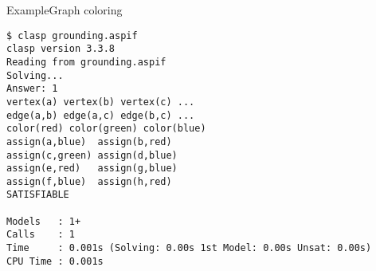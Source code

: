 \begin{frame}[fragile]{Example}{Graph coloring}
\begin{adjustbox}{max totalsize={\textwidth}{.83\textheight},keepaspectratio}
\begin{lstlisting}
$ clasp grounding.aspif
clasp version 3.3.8
Reading from grounding.aspif
Solving...
Answer: 1
vertex(a) vertex(b) vertex(c) ...
edge(a,b) edge(a,c) edge(b,c) ...
color(red) color(green) color(blue)
assign(a,blue)  assign(b,red)
assign(c,green) assign(d,blue)
assign(e,red)   assign(g,blue)
assign(f,blue)  assign(h,red)
SATISFIABLE

Models   : 1+
Calls    : 1
Time     : 0.001s (Solving: 0.00s 1st Model: 0.00s Unsat: 0.00s)
CPU Time : 0.001s
\end{lstlisting}%
\end{adjustbox}
\end{frame}
